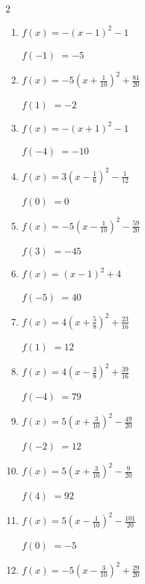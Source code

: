 \begin{multicols}{2}
\begin{enumerate}
  \item $\displaystyle f(x)=-\left( x-1\right)^{2}-1$

$f(-1)$
        $=-5$

  \item $\displaystyle f(x)=-5\left( x+\frac{1}{10}\right)^{2}+\frac{81}{20}$

$f(1)$
        $=-2$

  \item $\displaystyle f(x)=-\left( x+1\right)^{2}-1$

$f(-4)$
        $=-10$

  \item $\displaystyle f(x)=3\left( x-\frac{1}{6}\right)^{2}-\frac{1}{12}$

$f(0)$
        $=0$

\columnbreak %

  \item $\displaystyle f(x)=-5\left( x-\frac{1}{10}\right)^{2}-\frac{59}{20}$

$f(3)$
        $=-45$

  \item $\displaystyle f(x)=\left( x-1\right)^{2}+4$

$f(-5)$
        $=40$

  \item $\displaystyle f(x)=4\left( x+\frac{5}{8}\right)^{2}+\frac{23}{16}$

$f(1)$
        $=12$

  \item $\displaystyle f(x)=4\left( x-\frac{3}{8}\right)^{2}+\frac{39}{16}$

$f(-4)$
        $=79$

  \item $\displaystyle f(x)=5\left( x+\frac{3}{10}\right)^{2}-\frac{49}{20}$

$f(-2)$
        $=12$

\columnbreak %

\resetques

  \item $\displaystyle f(x)=5\left( x+\frac{3}{10}\right)^{2}-\frac{9}{20}$

$f(4)$
        $=92$

  \item $\displaystyle f(x)=5\left( x-\frac{1}{10}\right)^{2}-\frac{101}{20}$

$f(0)$
        $=-5$

  \item $\displaystyle f(x)=-5\left( x-\frac{3}{10}\right)^{2}+\frac{29}{20}$


\end{enumerate}
\end{multicols}
